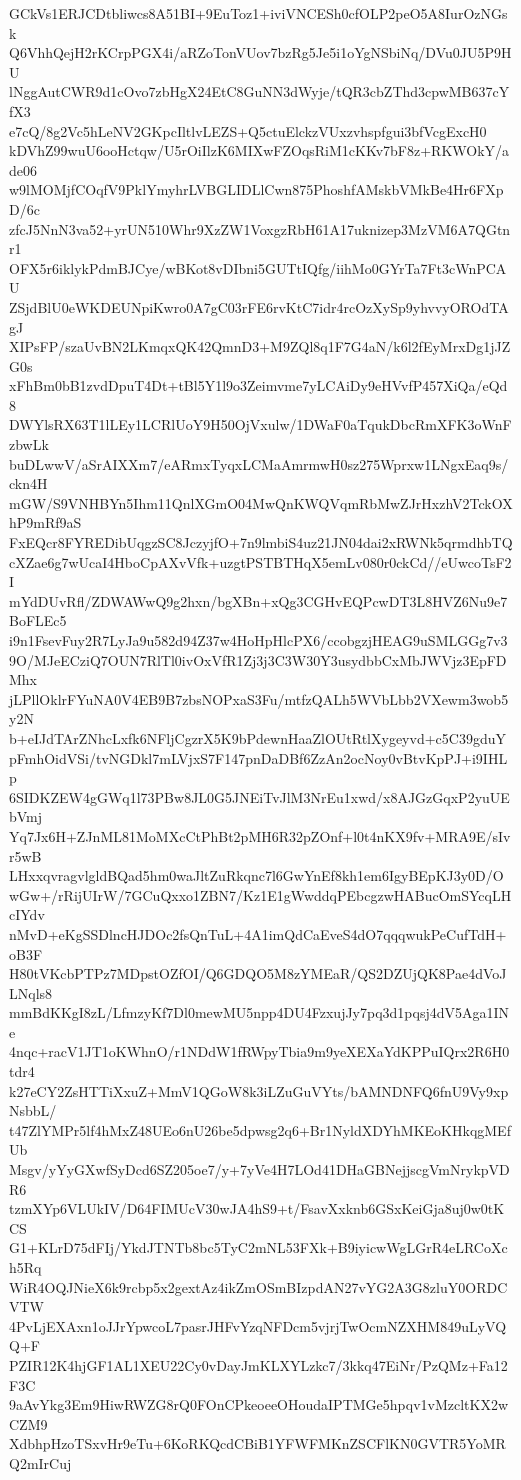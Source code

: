 GCkVs1ERJCDtbliwcs8A51BI+9EuToz1+iviVNCESh0cfOLP2peO5A8IurOzNGsk
Q6VhhQejH2rKCrpPGX4i/aRZoTonVUov7bzRg5Je5i1oYgNSbiNq/DVu0JU5P9HU
lNggAutCWR9d1cOvo7zbHgX24EtC8GuNN3dWyje/tQR3cbZThd3cpwMB637cYfX3
e7cQ/8g2Vc5hLeNV2GKpcIltlvLEZS+Q5ctuElckzVUxzvhspfgui3bfVcgExcH0
kDVhZ99wuU6ooHctqw/U5rOiIlzK6MIXwFZOqsRiM1cKKv7bF8z+RKWOkY/ade06
w9lMOMjfCOqfV9PklYmyhrLVBGLIDLlCwn875PhoshfAMskbVMkBe4Hr6FXpD/6c
zfcJ5NnN3va52+yrUN510Whr9XzZW1VoxgzRbH61A17uknizep3MzVM6A7QGtnr1
OFX5r6iklykPdmBJCye/wBKot8vDIbni5GUTtIQfg/iihMo0GYrTa7Ft3cWnPCAU
ZSjdBlU0eWKDEUNpiKwro0A7gC03rFE6rvKtC7idr4rcOzXySp9yhvvyOROdTAgJ
XIPsFP/szaUvBN2LKmqxQK42QmnD3+M9ZQl8q1F7G4aN/k6l2fEyMrxDg1jJZG0s
xFhBm0bB1zvdDpuT4Dt+tBl5Y1l9o3Zeimvme7yLCAiDy9eHVvfP457XiQa/eQd8
DWYlsRX63T1lLEy1LCRlUoY9H50OjVxulw/1DWaF0aTqukDbcRmXFK3oWnFzbwLk
buDLwwV/aSrAIXXm7/eARmxTyqxLCMaAmrmwH0sz275Wprxw1LNgxEaq9s/ckn4H
mGW/S9VNHBYn5Ihm11QnlXGmO04MwQnKWQVqmRbMwZJrHxzhV2TckOXhP9mRf9aS
FxEQcr8FYREDibUqgzSC8JczyjfO+7n9lmbiS4uz21JN04dai2xRWNk5qrmdhbTQ
cXZae6g7wUcaI4HboCpAXvVfk+uzgtPSTBTHqX5emLv080r0ckCd//eUwcoTsF2I
mYdDUvRfl/ZDWAWwQ9g2hxn/bgXBn+xQg3CGHvEQPcwDT3L8HVZ6Nu9e7BoFLEc5
i9n1FsevFuy2R7LyJa9u582d94Z37w4HoHpHlcPX6/ccobgzjHEAG9uSMLGGg7v3
9O/MJeECziQ7OUN7RlTl0ivOxVfR1Zj3j3C3W30Y3usydbbCxMbJWVjz3EpFDMhx
jLPllOklrFYuNA0V4EB9B7zbsNOPxaS3Fu/mtfzQALh5WVbLbb2VXewm3wob5y2N
b+eIJdTArZNhcLxfk6NFljCgzrX5K9bPdewnHaaZlOUtRtlXygeyvd+c5C39gduY
pFmhOidVSi/tvNGDkl7mLVjxS7F147pnDaDBf6ZzAn2ocNoy0vBtvKpPJ+i9IHLp
6SIDKZEW4gGWq1l73PBw8JL0G5JNEiTvJlM3NrEu1xwd/x8AJGzGqxP2yuUEbVmj
Yq7Jx6H+ZJnML81MoMXcCtPhBt2pMH6R32pZOnf+l0t4nKX9fv+MRA9E/sIvr5wB
LHxxqvragvlgldBQad5hm0waJltZuRkqnc7l6GwYnEf8kh1em6IgyBEpKJ3y0D/O
wGw+/rRijUIrW/7GCuQxxo1ZBN7/Kz1E1gWwddqPEbcgzwHABucOmSYcqLHcIYdv
nMvD+eKgSSDlncHJDOc2fsQnTuL+4A1imQdCaEveS4dO7qqqwukPeCufTdH+oB3F
H80tVKcbPTPz7MDpstOZfOI/Q6GDQO5M8zYMEaR/QS2DZUjQK8Pae4dVoJLNqls8
mmBdKKgI8zL/LfmzyKf7Dl0mewMU5npp4DU4FzxujJy7pq3d1pqsj4dV5Aga1INe
4nqc+racV1JT1oKWhnO/r1NDdW1fRWpyTbia9m9yeXEXaYdKPPuIQrx2R6H0tdr4
k27eCY2ZsHTTiXxuZ+MmV1QGoW8k3iLZuGuVYts/bAMNDNFQ6fnU9Vy9xpNsbbL/
t47ZlYMPr5lf4hMxZ48UEo6nU26be5dpwsg2q6+Br1NyldXDYhMKEoKHkqgMEfUb
Msgv/yYyGXwfSyDcd6SZ205oe7/y+7yVe4H7LOd41DHaGBNejjscgVmNrykpVDR6
tzmXYp6VLUkIV/D64FIMUcV30wJA4hS9+t/FsavXxknb6GSxKeiGja8uj0w0tKCS
G1+KLrD75dFIj/YkdJTNTb8bc5TyC2mNL53FXk+B9iyicwWgLGrR4eLRCoXch5Rq
WiR4OQJNieX6k9rcbp5x2gextAz4ikZmOSmBIzpdAN27vYG2A3G8zluY0ORDCVTW
4PvLjEXAxn1oJJrYpwcoL7pasrJHFvYzqNFDcm5vjrjTwOcmNZXHM849uLyVQQ+F
PZIR12K4hjGF1AL1XEU22Cy0vDayJmKLXYLzkc7/3kkq47EiNr/PzQMz+Fa12F3C
9aAvYkg3Em9HiwRWZG8rQ0FOnCPkeoeeOHoudaIPTMGe5hpqv1vMzcltKX2wCZM9
XdbhpHzoTSxvHr9eTu+6KoRKQcdCBiB1YFWFMKnZSCFlKN0GVTR5YoMRQ2mIrCuj

